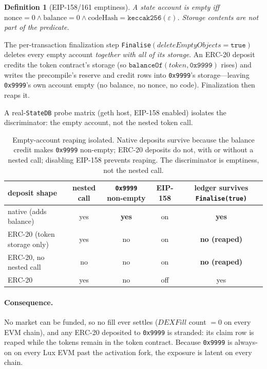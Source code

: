\documentclass[11pt,a4paper]{article}
\newtheorem{definition}{Definition}[section]
\begin{document}
\begin{definition}[EIP-158/161 emptiness]
A state account is \emph{empty} iff $\mathrm{nonce}=0 \wedge \mathrm{balance}=0 \wedge
\mathrm{codeHash}=\texttt{keccak256}(\varepsilon)$. Storage contents are not part of the predicate.
\end{definition}

The per-transaction finalization step \texttt{Finalise}$(\mathit{deleteEmptyObjects}=\texttt{true})$
deletes every empty account \emph{together with all of its storage}. An ERC-20 deposit credits the
token contract's storage (so $\texttt{balanceOf}(\mathit{token},\texttt{0x9999})$ rises) and writes
the precompile's reserve and credit rows into \texttt{0x9999}'s storage---leaving \texttt{0x9999}'s
own account empty (no balance, no nonce, no code). Finalization then reaps it.

A real-\texttt{StateDB} probe matrix (geth host, EIP-158 enabled) isolates the discriminator: the
empty account, not the nested token call.

\begin{table}[H]
\centering
\begin{tabularx}{\textwidth}{Xccc c}
\toprule
\textbf{deposit shape} & \textbf{nested call} & \textbf{\texttt{0x9999} non-empty} &
\textbf{EIP-158} & \textbf{ledger survives \texttt{Finalise(true)}} \\
\midrule
native (adds balance)        & yes & \textbf{yes} & on  & \textbf{yes} \\
ERC-20 (token storage only)  & yes & no          & on  & \textbf{no (reaped)} \\
ERC-20, no nested call       & no  & no          & on  & \textbf{no (reaped)} \\
ERC-20                       & yes & no          & off & yes \\
\bottomrule
\end{tabularx}
\caption{Empty-account reaping isolated. Native deposits survive because the balance credit makes
\texttt{0x9999} non-empty; ERC-20 deposits do not, with or without a nested call; disabling EIP-158
prevents reaping. The discriminator is emptiness, not the nested call.}
\end{table}

\paragraph{Consequence.} No market can be funded, so no fill ever settles
($\mathit{DEXFill}$ count $=0$ on every EVM chain), and any ERC-20 deposited to \texttt{0x9999} is
stranded: its claim row is reaped while the tokens remain in the token contract. Because
\texttt{0x9999} is always-on on every Lux EVM past the activation fork, the exposure is latent on
every chain.
\end{document}
